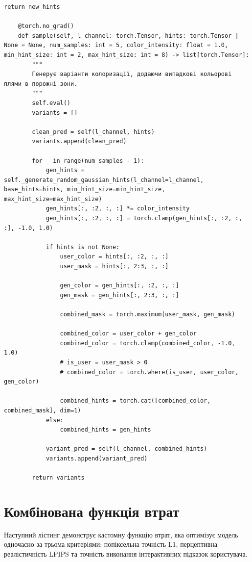 \begin{lstlisting}[caption={Методи стохастичної генерації варіантів колоризації}]
        return new_hints

    @torch.no_grad()
    def sample(self, l_channel: torch.Tensor, hints: torch.Tensor | None = None, num_samples: int = 5, color_intensity: float = 1.0, min_hint_size: int = 2, max_hint_size: int = 8) -> list[torch.Tensor]:
        """
        Генерує варіанти колоризації, додаючи випадкові кольорові плями в порожні зони.
        """
        self.eval()
        variants = []

        clean_pred = self(l_channel, hints)
        variants.append(clean_pred)

        for _ in range(num_samples - 1):
            gen_hints = self._generate_random_gaussian_hints(l_channel=l_channel, base_hints=hints, min_hint_size=min_hint_size, max_hint_size=max_hint_size)
            gen_hints[:, :2, :, :] *= color_intensity
            gen_hints[:, :2, :, :] = torch.clamp(gen_hints[:, :2, :, :], -1.0, 1.0)

            if hints is not None:
                user_color = hints[:, :2, :, :]
                user_mask = hints[:, 2:3, :, :]
                
                gen_color = gen_hints[:, :2, :, :]
                gen_mask = gen_hints[:, 2:3, :, :]

                combined_mask = torch.maximum(user_mask, gen_mask)

                combined_color = user_color + gen_color
                combined_color = torch.clamp(combined_color, -1.0, 1.0)
                # is_user = user_mask > 0
                # combined_color = torch.where(is_user, user_color, gen_color)

                combined_hints = torch.cat([combined_color, combined_mask], dim=1)
            else:
                combined_hints = gen_hints

            variant_pred = self(l_channel, combined_hints)
            variants.append(variant_pred)
            
        return variants
\end{lstlisting}

\section{Комбінована функція втрат}

Наступний лістинг демонструє кастомну функцію втрат, яка оптимізує модель одночасно за трьома критеріями: попіксельна точність L1, перцептивна реалістичність LPIPS та точність виконання інтерактивних підказок користувача.

